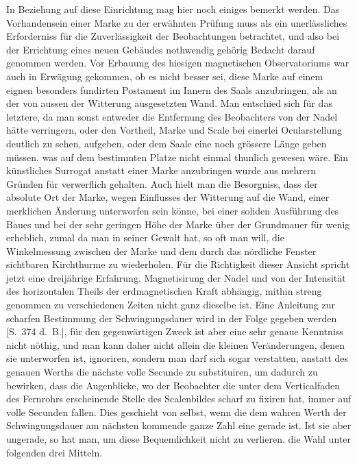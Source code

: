\expandafter\def\csname HistoricalNoteText559\endcsname{In Beziehung auf diese Einrichtung mag hier noch einiges bemerkt werden. Das Vorhandensein einer Marke zu der erwähnten Prüfung muss als ein unerlässliches Erforderniss für die Zuverlässigkeit der Beobachtungen betrachtet, und also bei der Errichtung eines neuen Gebäudes nothwendig gehörig Bedacht darauf genommen werden. Vor Erbauung des hiesigen magnetischen Observatoriums war auch in Erwägung gekommen, ob es nicht besser sei, diese Marke auf einem eignen besonders fundirten Postament im Innern des Saals anzubringen, als an der von aussen der Witterung ausgesetzten Wand. Man entschied sich für das letztere, da man sonst entweder die Entfernung des Beobachters von der Nadel hätte verringern, oder den Vortheil, Marke und Scale bei einerlei Ocularstellung deutlich zu sehen, aufgeben, oder dem Saale eine noch grössere Länge geben müssen. was auf dem bestimmten Platze nicht einmal thunlich gewesen wäre. Ein künstliches Surrogat anstatt einer Marke anzubringen wurde aus mehrern Gründen für verwerflich gehalten. Auch hielt man die Besorgniss, dass der absolute Ort der Marke, wegen Einflusses der Witterung auf die Wand, einer merklichen Änderung unterworfen sein könne, bei einer soliden Ausführung des Baues und bei der sehr geringen Höhe der Marke über der Grundmauer für wenig erheblich, zumal da man in seiner Gewalt hat, so oft man will, die Winkelmessung zwischen der Marke und dem durch das nördliche Fenster sichtbaren Kirchthurme zu wiederholen. Für die Richtigkeit dieser Ansicht spricht jetzt eine dreijährige Erfahrung.}
Magnetisirung der Nadel und von der Intensität des horizontalen Theils der erdmagnetischen Kraft abhängig, mithin streng genommen zu verschiedenen Zeiten nicht ganz dieselbe ist. Eine Anleitung zur scharfen Bestimmung der Schwingungsdauer wird in der Folge gegeben werden [S.\ 374 d.\ B.], für den gegenwärtigen Zweck ist aber eine sehr genaue Kenntniss nicht nöthig, und man kann daher nicht allein die kleinen Veränderungen, denen sie unterworfen ist, ignoriren, sondern man darf sich sogar verstatten, anstatt des genauen Werths die nächste volle Secunde zu substituiren, um dadurch zu bewirken, dass die Augenblicke, wo der Beobachter die unter dem Verticalfaden des Fernrohrs erscheinende Stelle des Scalenbildes scharf zu fixiren hat, immer auf volle Secunden fallen. Dies geschieht von selbst, wenn die dem wahren Werth der Schwingungsdauer am nächsten kommende ganze Zahl eine gerade ist. Ist sie aber ungerade, so hat man, um diese Bequemlichkeit nicht zu verlieren. die Wahl unter folgenden drei Mitteln.

